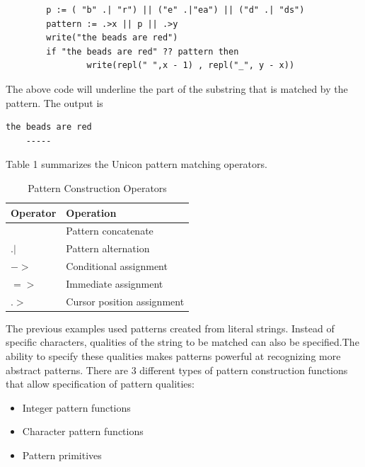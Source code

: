 \documentclass[letterpaper,12pt]{article}
\begin{document}
\begin{verbatim}
        p := ( "b" .| "r") || ("e" .|"ea") || ("d" .| "ds")
        pattern := .>x || p || .>y
        write("the beads are red")
        if "the beads are red" ?? pattern then 
                write(repl(" ",x - 1) , repl("_", y - x))
\end{verbatim}

The above code will underline the part of the substring that is
matched by the pattern. The output is

\begin{verbatim}
the beads are red
    -----
\end{verbatim}

Table 1 summarizes the Unicon pattern matching operators.

\begin{table}[h]
\begin{center}
	{\begin{tabular}{ | l | l | } \hline 
	Operator & Operation \\ \hline
	\textbar\textbar & Pattern concatenate \\
	\(.|\) & Pattern alternation \\
	\(-\!\!>\) & Conditional assignment \\
	$=>$ & Immediate assignment \\
	$.>$ & Cursor position assignment \\
	\hline
	\end{tabular}}
 	\caption{Pattern Construction Operators}
	\label{Table 1: Pattern Construction Operators}
\end{center}
\end{table}

The previous examples used patterns created from literal
strings. Instead of specific characters, qualities of the string to be
matched can also be specified.The ability to specify these qualities
makes patterns powerful at recognizing more abstract patterns. There
are 3 different types of pattern construction functions that allow
specification of pattern qualities:

\begin{itemize}
\item Integer pattern functions
\item Character pattern functions
\item Pattern primitives
\end{itemize}
\end{document}
